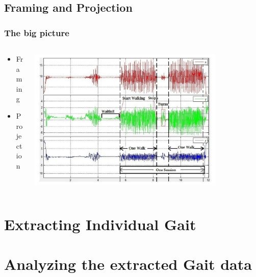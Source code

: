 \documentclass{beamer}
\begin{document}
\subsection{Framing and Projection}
\begin{frame}
  \frametitle{The big picture}
  
  \begin{columns}
  \begin{column}{0.4\textwidth}
  \begin{itemize}
  	\item Framing
  	\linebreak
	\item Projection
  \end{itemize}
  \end{column}
  \begin{column}{0.8\textwidth}
   \includegraphics[width=0.8\textwidth]{Illustrations/gaitpatterns.png}
       \\
  \end{column}
  \end{columns}
\end{frame}

\section[Gait Extraction]{Extracting Individual Gait}
	
\section[Gait Analysis]{Analyzing the extracted Gait data}
	
\end{document}
